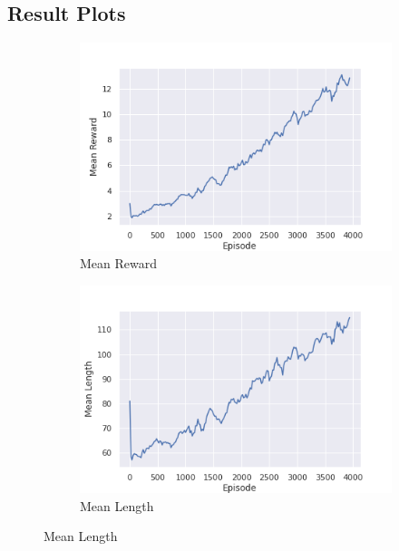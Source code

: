 \begin{appendices}
    \section{Result Plots}\label{app:results}
    \begin{figure}[h]
        \centering{}
        \begin{subfigure}{0.49\linewidth}
            \centering{}
            \includegraphics[width=\linewidth, height=0.3\textheight, keepaspectratio]{img/result_img/mean_reward.png}
            \caption{Mean Reward}
        \end{subfigure}
        \begin{subfigure}{0.49\linewidth}
            \centering{}
            \includegraphics[width=\linewidth, height=0.3\textheight, keepaspectratio]{img/result_img/mean_length.png}
            \caption{Mean Length}
        \end{subfigure}

\end{figure}
\end{appendices}

